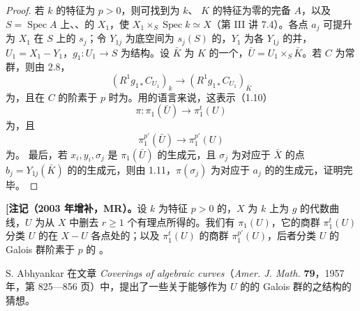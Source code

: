 \begin{proof}
若 $k$ 的特征为 $p>0$，则可找到为 $k$、 $K$ 的特征为零的完备 $A$，以及 $S=\operatorname{Spec}A$ 上、、的 $X_1$，使 $X_1\times_S\operatorname{Spec}k\simeq X$（第 III 讲 7.4）。各点 $a_j$ 可提升为 $X_1$ 在 $S$ 上的 $s_j$；令 $Y_{1j}$ 为底空间为 $s_j(S)$ 的，$Y_1$ 为各 $Y_{1j}$ 的并，$U_1=X_1-Y_1$，$g_1:U_1\to S$ 为结构。设 $\bar K$ 为 $K$ 的一个，$\bar U=U_1\times_S\bar K$。若 $C$ 为常群，则由 2.8，
\[(R^1g_{1*}C_{U_1})_k\longrightarrow(R^1g_{1*}C_{U_1})_{\bar K}\]
为，且在 $C$ 的阶素于 $p$ 时为。用的语言来说，这表示（1.10）
\[\pi:\pi_1(\bar U)\longrightarrow\pi_1^t(U)\]
为，且
\[\pi_1^{p'}(\bar U)\longrightarrow\pi_1^{p'}(U)\]
为。
最后，若 $x_i,y_i,\sigma_j$ 是 $\pi_1(\bar U)$ 的生成元，且 $\sigma_j$ 为对应于 $\bar X$ 的点 $b_j=Y_{1j}(\bar K)$ 的的生成元，则由 1.11，$\pi(\sigma_j)$ 为对应于 $a_j$ 的的生成元，证明完毕。
\end{proof}

\textbf{[注记（2003 年增补，MR）。}设 $k$ 为特征 $p>0$ 的，$X$ 为 $k$ 上为 $g$ 的代数曲线，$U$ 为从 $X$ 中删去 $r\geqslant1$ 个有理点所得的。我们有 $\pi_1(U)$，它的商群 $\pi_1^t(U)$ 分类 $U$ 的在 $X-U$ 各点处的；以及 $\pi_1^t(U)$ 的商群 $\pi_1^{p'}(U)$，后者分类 $U$ 的 Galois 群阶素于 $p$ 的 。

S. Abhyankar 在文章 \textit{Coverings of algebraic curves}（\textit{Amer. J. Math.} \textbf{79}，1957 年，第 825—856 页）中，提出了一些关于能够作为 $U$ 的的 Galois 群的之结构的猜想。

